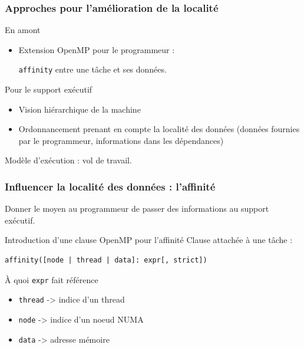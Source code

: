 \documentclass[xcolor={usenames,dvipsnames,svgnames,table}, aspectratio=43]{beamer}
\begin{document}
\begin{frame}[fragile]
\frametitle{Approches pour l'amélioration de la localité}

  \begin{block}{En amont}
    \begin{itemize}
      \item Extension OpenMP pour le programmeur :

        \verb/affinity/ entre une tâche et ses données.
    \end{itemize}
  \end{block}

  \begin{block}{Pour le support exécutif}
    \begin{itemize}
      \item Vision hiérarchique de la machine
      \item Ordonnancement prenant en compte la localité des données (données fournies par le programmeur, informations dans les dépendances)
    \end{itemize}
    Modèle d'exécution : vol de travail.
  \end{block}

\end{frame}

\begin{frame}[fragile]
\frametitle{Influencer la localité des données : l'affinité}

Donner le moyen au programmeur de passer des informations au support exécutif.

\begin{block}{Introduction d'une clause OpenMP pour l'affinité}
  Clause attachée à une tâche :
  \begin{lstlisting}[numbers=none, basicstyle=\normalsize]
  affinity([node | thread | data]: expr[, strict])
  \end{lstlisting}
\end{block}
\begin{block}{À quoi \texttt{expr} fait référence}
  \begin{itemize}
    \item \texttt{thread} -> indice d'un thread
    \item \texttt{node} -> indice d'un noeud NUMA
    \item \texttt{data} -> adresse mémoire
  \end{itemize}
\end{block}


\end{frame}
\end{document}
